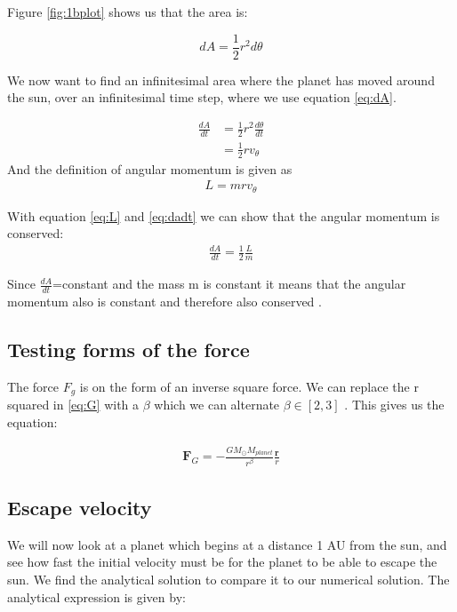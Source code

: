 \documentclass{article}
\begin{document}
Figure \ref{fig:1bplot} shows us that the area is:

\begin{equation}
    dA=\frac{1}{2}r^2d\theta
\label{eq:dA}
\end{equation}

We now want to find an infinitesimal area where the planet has moved around the sun, over an infinitesimal time step, where we use equation \ref{eq:dA}.

\begin{align}
    \frac{dA}{dt}&=\frac{1}2{r^2}\frac{d\theta}{dt}\\
    &=\frac{1}{2}rv_\theta
    \label{eq:dadt}
\end{align}
And the definition of angular momentum is given as
\begin{align}
    L=mrv_\theta
     \label{eq:L}
\end{align}

With equation \ref{eq:L} and \ref{eq:dadt} we can show that the angular momentum is conserved:
\begin{align*}
    \frac{dA}{dt}=\frac{1}{2}\frac{L}{m}
\end{align*}

Since $\frac{dA}{dt}$=constant and the mass m is constant it means that the angular momentum also is constant and therefore also conserved \cite{96}.  

\subsection{Testing forms of the force}

The force $F_g$ is on the form of an inverse square force. We can replace the r squared in \ref{eq:G} with a $\beta$ which we can alternate $\beta \in [2,3]$ . This gives us the equation:

\begin{align}
    \mathbf{F}_G=-\frac{GM_{\odot}M_{planet}}{r^{\beta}}\frac{\mathbf{r}}{r}
    \label{eq:F_b}
\end{align}

\subsection{Escape velocity}
We will now look at a planet which begins at a distance 1 AU from the sun, 
and see how fast the initial velocity must be for the planet to be able to escape the sun. We find the analytical solution to compare it to our numerical solution. The analytical expression is given by:
\end{document}
